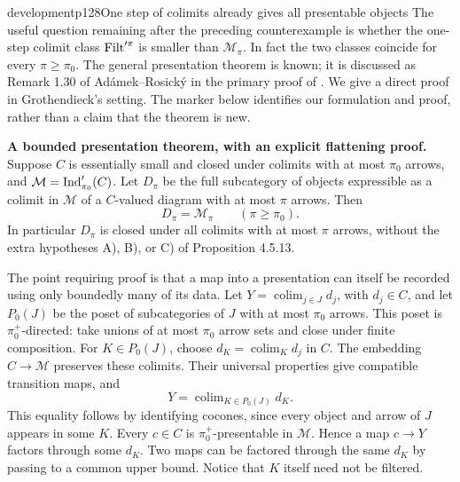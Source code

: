 \begin{dcomment}{development}{p128}{One step of colimits already gives all presentable objects}
The useful question remaining after the preceding counterexample is whether the one-step colimit class $\operatorname{Filt}'^\pi$ is smaller than $\mathcal M_\pi$. In fact the two classes coincide for every $\pi\geq\pi_0$. The general presentation theorem is known; it is discussed as Remark 1.30 of Ad\'amek--Rosick\'y in the primary proof of \citet{Barton2019Presentable}. We give a direct proof in Grothendieck's setting. The marker below identifies our formulation and proof, rather than a claim that the theorem is new.

\textbf{A bounded presentation theorem, with an explicit flattening proof.}\ours{}
Suppose $C$ is essentially small and closed under colimits with at most $\pi_0$ arrows, and $\mathcal M=\operatorname{Ind}'_{\pi_0}(C)$. Let $D_\pi$ be the full subcategory of objects expressible as a colimit in $\mathcal M$ of a $C$-valued diagram with at most $\pi$ arrows. Then
\[
 D_\pi=\mathcal M_\pi\qquad(\pi\geq\pi_0).
\]
In particular $D_\pi$ is closed under all colimits with at most $\pi$ arrows, without the extra hypotheses A), B), or C) of Proposition 4.5.13.

The point requiring proof is that a map into a presentation can itself be recorded using only boundedly many of its data. Let $Y=\operatorname{colim}_{j\in J}d_j$, with $d_j\in C$, and let $P_0(J)$ be the poset of subcategories of $J$ with at most $\pi_0$ arrows. This poset is $\pi_0^+$-directed: take unions of at most $\pi_0$ arrow sets and close under finite composition. For $K\in P_0(J)$, choose $d_K=\operatorname{colim}_K d_j$ in $C$. The embedding $C\to\mathcal M$ preserves these colimits. Their universal properties give compatible transition maps, and
\[
 Y=\operatorname{colim}_{K\in P_0(J)}d_K.
\]
This equality follows by identifying cocones, since every object and arrow of $J$ appears in some $K$. Every $c\in C$ is $\pi_0^+$-presentable in $\mathcal M$. Hence a map $c\to Y$ factors through some $d_K$. Two maps can be factored through the same $d_K$ by passing to a common upper bound. Notice that $K$ itself need not be filtered.


\end{dcomment}
